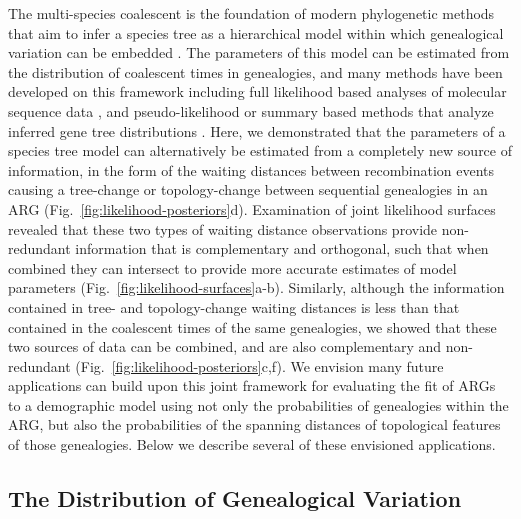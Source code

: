 \documentclass[11pt]{article}
\begin{document}
The multi-species coalescent is the foundation of modern phylogenetic 
methods that aim to infer a species tree as a hierarchical model within
which genealogical variation can be embedded
\citep{maddison1997gene,degnan2009gene,maddison2006inferring}.
The parameters of this model can be estimated from the distribution
of coalescent times in genealogies, and many methods have been developed
on this framework including full likelihood based analyses of molecular
sequence data \citep{rannala2003bayes}, and pseudo-likelihood or summary
based methods that analyze inferred gene tree distributions
\citep{mirarab_multispecies_2021}. 
% 
Here, we demonstrated that the parameters of a species tree model can 
alternatively be estimated from a completely new source of information,
in the form of the waiting distances between recombination events causing
a tree-change or topology-change between sequential genealogies in an ARG
(Fig.~\ref{fig:likelihood-posteriors}d).
% 
Examination of joint likelihood surfaces revealed that these two 
types of waiting distance observations provide non-redundant 
information that is complementary and orthogonal, such that when
combined they can intersect to provide more accurate estimates of 
model parameters
(Fig.~\ref{fig:likelihood-surfaces}a-b). 
% 
Similarly, although the information contained in tree- and topology-change
waiting distances is less than that contained in the coalescent times of the
same genealogies, we showed that these two sources of data can be combined,
and are also complementary and non-redundant
(Fig.~\ref{fig:likelihood-posteriors}c,f).
% 
We envision many future applications can build upon this joint framework for
evaluating the fit of ARGs to a demographic model using not only the
probabilities of genealogies within the ARG, but also the probabilities of
the spanning distances of topological features of those genealogies.
Below we describe several of these envisioned applications.


\subsection{The Distribution of Genealogical Variation}
\end{document}
